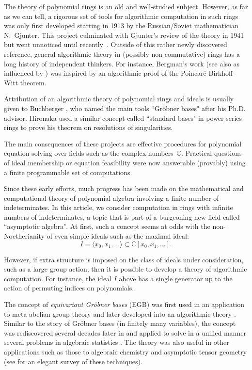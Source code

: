 The theory of polynomial rings is an old and well-studied subject.  However, as far as we can tell, a rigorous set of tools for algorithmic computation in such rings was only first developed starting in 1913 \cite{gjunter1913} by the Russian/Soviet mathematician N.~Gjunter.  This project culminated with Gjunter's review of the theory in 1941 \cite{gunther1941modules} but went unnoticed until recently~\cite{renschuch2003contributions}.  Outside of this rather newly discovered reference, general algorithmic theory in (possibly non-commutative) rings has a long history of independent thinkers.  For instance, Bergman's work \cite{bergman1978diamond} (see also \cite{bokut1976embeddings} as influenced by \cite{shirshov1962some}) was inspired by an algorithmic proof of the Poincar\'e-Birkhoff-Witt theorem.  

Attribution of an algorithmic theory of polynomial rings and ideals is usually given to Buchberger \cite{buchberger1965algorithmus}, who named the main tools ``Gr\"obner bases" after his Ph.D. advisor. Hironaka \cite{hironaka1964resolution} used a similar concept called ``standard bases" in power series rings to prove his theorem on resolutions of singularities.  

The main consequences of these projects are effective procedures for polynomial equation solving over fields such as the complex numbers~$\mathbb{C}$.  Practical questions of ideal membership or equation feasibility were now answerable (provably) using a finite programmable set of computations.  

Since these early efforts, much progress has been made on the mathematical and computational theory of polynomial algebra involving a finite number of indeterminates.  In this article, we consider computation in rings with infinite numbers of indeterminates, a topic that is part of a burgeoning new field called ``asymptotic algebra".  At first, such a concept seems at odds with the non-Noetherianity of even simple ideals such as the maximal ideal: \[I = \langle x_0, x_1, \ldots  \rangle \subset \mathbb C[x_0, x_1,\ldots].\]

However, if extra structure is imposed on the class of ideals under consideration, such as a large group action, then it is possible to develop a theory of algorithmic computation.  For instance, the ideal $I$ above has a single generator up to the action of permuting indices on polynomials.

The concept of \emph{equivariant Gr\"obner bases} (EGB) was first used in an application to meta-abelian group theory \cite{cohen1967laws} and later developed into an algorithmic theory \cite{Emmott, Cohen87}. Similar to the story of Gr\"obner bases (in finitely many variables), the concept was rediscovered several decades later in \cite{aschenbrenner2007finite, aschenbrenner2008algorithm} and applied to solve in a unified manner several problems in algebraic statistics \cite{hillar2012finite}.  The theory was also useful in other applications such as those to algebraic chemistry \cite{Draisma08b} and asymptotic tensor geometry \cite{draisma2014bounded} (see \cite{draisma2014noetherianity} for an elegant survey of these techniques).

